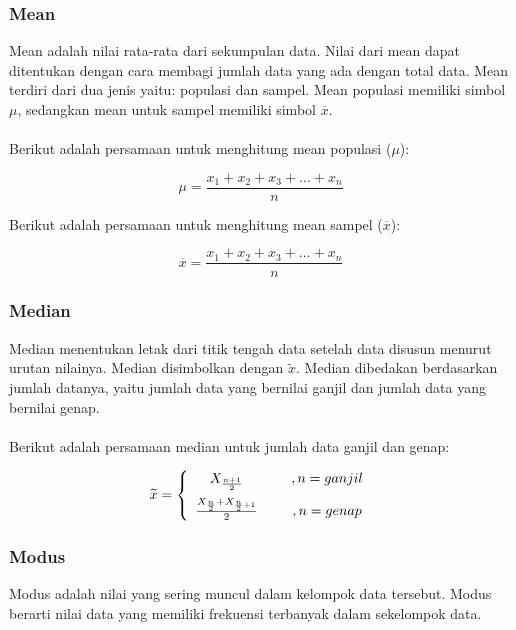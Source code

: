 \subsubsection{Mean}
Mean adalah nilai rata-rata dari sekumpulan data. Nilai dari mean dapat ditentukan dengan cara membagi jumlah data yang ada dengan total data. Mean terdiri dari dua jenis yaitu: populasi dan sampel. Mean populasi memiliki simbol $\mu$, sedangkan mean untuk sampel memiliki simbol $\overline{x}$.   
\\\\
Berikut adalah persamaan untuk menghitung mean populasi ($\mu$):

\begin{equation}
\mu = \frac{x_1+x_2+x_3+\ldots+x_n}{n}
\end{equation}

\noindent Berikut adalah persamaan untuk menghitung mean sampel ($\overline{x}$):

\begin{equation}
\overline{x} = \frac{x_1+x_2+x_3+\ldots+x_n}{n}
\end{equation}


\subsubsection{Median}
Median menentukan letak dari titik tengah data setelah data disusun menurut urutan nilainya. Median disimbolkan dengan $\widetilde x$. Median dibedakan  berdasarkan jumlah datanya, yaitu jumlah data yang bernilai ganjil dan jumlah data yang bernilai genap. 
\\\\
\noindent Berikut adalah persamaan median untuk jumlah data ganjil dan genap:

\begin{align}
\widetilde x = 
\left\{ \begin{array}{cc} 
X_{\frac{n+1}{2}} & \hspace{5mm} ,n=ganjil \vspace{2mm}\\
\frac{X_{\frac{n}{2}}+X_{\frac{n}{2}+1}}{2}  & \hspace{5mm} ,n=genap \\
 \end{array} 
 \right.
\end{align}

\subsubsection{Modus}
Modus adalah nilai yang sering muncul dalam kelompok data tersebut. Modus berarti nilai data yang memiliki frekuensi terbanyak dalam sekelompok data. 


